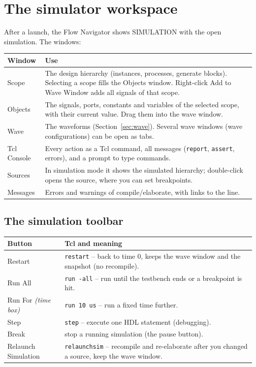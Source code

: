 \documentclass[11pt,a4paper]{article}
\newcommand{\code}[1]{\texttt{#1}}
\renewcommand{\_}{\oldunderscore\allowbreak{}}
\newcommand{\menu}[1]{\textsf{#1}}
\begin{document}
\section{The simulator workspace}\label{sec:workspace}
After a launch, the Flow Navigator shows \menu{SIMULATION} with the open simulation. The windows:

\begin{tabularx}{\textwidth}{@{}lY@{}}
\toprule
\textbf{Window} & \textbf{Use} \\
\midrule
Scope & The design hierarchy (instances, processes, generate blocks). Selecting a scope fills the Objects window. Right-click \menu{Add to Wave Window} adds all signals of that scope. \\
Objects & The signals, ports, constants and variables of the selected scope, with their current value. Drag them into the wave window. \\
Wave & The waveforms (Section~\ref{sec:wave}). Several wave windows (wave configurations) can be open as tabs. \\
Tcl Console & Every action as a Tcl command, all messages (\code{report}, \code{assert}, errors), and a prompt to type commands. \\
Sources & In simulation mode it shows the simulated hierarchy; double-click opens the source, where you can set breakpoints. \\
Messages & Errors and warnings of compile/elaborate, with links to the line. \\
\bottomrule
\end{tabularx}

\subsection{The simulation toolbar}
\begin{tabularx}{\textwidth}{@{}lY@{}}
\toprule
\textbf{Button} & \textbf{Tcl} and meaning \\
\midrule
Restart & \code{restart} -- back to time 0, keeps the wave window and the snapshot (no recompile). \\
Run All & \code{run -all} -- run until the testbench ends or a breakpoint is hit. \\
Run For \emph{(time box)} & \code{run 10 us} -- run a fixed time further. \\
Step & \code{step} -- execute one HDL statement (debugging). \\
Break & stop a running simulation (the pause button). \\
Relaunch Simulation & \code{relaunch\_sim} -- recompile and re-elaborate after you changed a source, keep the wave window. \\
\bottomrule
\end{tabularx}
\end{document}
